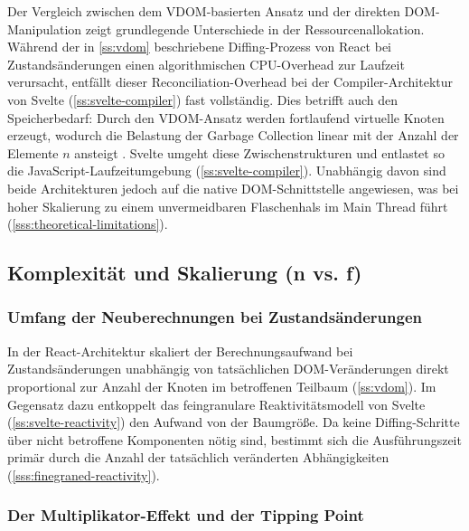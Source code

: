 Der Vergleich zwischen dem VDOM-basierten Ansatz und der direkten DOM-Manipulation zeigt grundlegende Unterschiede in der Ressourcenallokation. Während der in \cref{ss:vdom} beschriebene Diffing-Prozess von React bei Zustandsänderungen einen algorithmischen CPU-Overhead zur Laufzeit verursacht, entfällt dieser Reconciliation-Overhead bei der Compiler-Architektur von Svelte (\cref{ss:svelte-compiler}) fast vollständig. Dies betrifft auch den Speicherbedarf: Durch den VDOM-Ansatz werden fortlaufend virtuelle Knoten erzeugt, wodurch die Belastung der Garbage Collection linear mit der Anzahl der Elemente $n$ ansteigt \cite{bai-millionjs-2023, github-reactfiber-2016}. Svelte umgeht diese Zwischenstrukturen und entlastet so die JavaScript-Laufzeitumgebung (\cref{ss:svelte-compiler}). Unabhängig davon sind beide Architekturen jedoch auf die native DOM-Schnittstelle angewiesen, was bei hoher Skalierung zu einem unvermeidbaren Flaschenhals im Main Thread führt (\cref{sss:theoretical-limitations}).

\subsection{Komplexität und Skalierung (n vs. f)}
\label{ss:update-complexity}

\subsubsection{Umfang der Neuberechnungen bei Zustandsänderungen} 

In der React-Architektur skaliert der Berechnungsaufwand bei Zustandsänderungen unabhängig von tatsächlichen DOM-Veränderungen direkt proportional zur Anzahl der Knoten im betroffenen Teilbaum (\cref{ss:vdom}). Im Gegensatz dazu entkoppelt das feingranulare Reaktivitätsmodell von Svelte (\cref{ss:svelte-reactivity}) den Aufwand von der Baumgröße. Da keine Diffing-Schritte über nicht betroffene Komponenten nötig sind, bestimmt sich die Ausführungszeit primär durch die Anzahl der tatsächlich veränderten Abhängigkeiten (\cref{sss:finegraned-reactivity}).

\subsubsection{Der Multiplikator-Effekt und der Tipping Point}
\label{sss:tipping-point}


